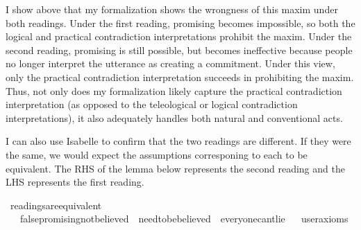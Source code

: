 \begin{isabellebody}
\begin{isamarkuptext}
I show above that my formalization shows the wrongness of this maxim under both readings. Under the 
first reading, promising becomes impossible, so both the logical and 
practical contradiction interpretations prohibit the maxim. Under the second reading, promising is still
possible, but becomes ineffective because people no longer interpret the utterance as creating a commitment.
Under this view, only the practical contradiction interpretation succeeds in prohibiting the maxim. Thus, 
not only does my formalization likely capture the practical contradiction interpretation (as opposed to 
the teleological or logical contradiction interpretations), it also adequately handles both natural 
and conventional acts.%
\end{isamarkuptext}\isamarkuptrue%
%
\begin{isamarkuptext}%
I can also use Isabelle to confirm that the two readings are different. If they were the same, 
we would expect the assumptions corresponing to each to be equivalent. The RHS of the lemma below represents 
the second reading and the LHS represents the first reading.%
\end{isamarkuptext}\isamarkuptrue%
\isamarkupfalse%
\ readings{\isacharunderscore}are{\isacharunderscore}equivalent{\isacharcolon}\isanewline
\ \ \ {\isachardoublequoteopen}false{\isacharunderscore}promising{\isacharunderscore}not{\isacharunderscore}believed\ {\isasymand}\ need{\isacharunderscore}to{\isacharunderscore}be{\isacharunderscore}believed\ {\isasymequiv}\ everyone{\isacharunderscore}can{\isacharprime}t{\isacharunderscore}lie{\isachardoublequoteclose}\isanewline
\ \ \isamarkupfalse%
{\isacharbrackleft}user{\isacharunderscore}axioms{\isacharbrackright}%
\isadelimproof
\ %
\endisadelimproof
%
\isatagproof
{}\isamarkupfalse%
\isanewline
%
\end{isabellebody}
